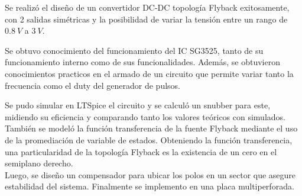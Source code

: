 Se realizó el diseño de un convertidor DC-DC topología Flyback exitosamente, con 2 salidas simétricas y la posibilidad de variar la tensión entre un rango de $0.8 \ V$ a $3 \ V$.

Se obtuvo conocimiento del funcionamiento del IC SG3525, tanto de su funcionamiento interno como de sus funcionalidades. Además, se obtuvieron conocimientos practicos en el armado de un circuito que permite variar tanto la frecuencia como el duty del generador de pulsos. 

Se pudo simular en LTSpice el circuito y se calculó un snubber para este, midiendo su eficiencia y comparando tanto los valores teóricos con simulados. También se modeló la función transferencia de la fuente Flyback mediante el uso de la promediación de variable de estados. Obteniendo la función transferencia, una particularidad de la topología Flyback es la existencia de un cero en el semiplano derecho.\\
 Luego, se diseño un compensador para ubicar los polos en un sector que asegure estabilidad del sistema. Finalmente se implemento en una placa multiperforada. 